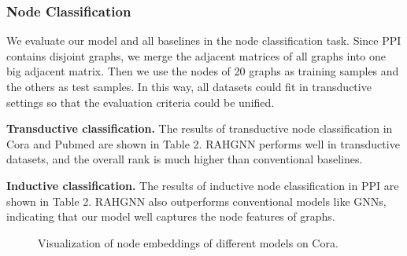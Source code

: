 \subsubsection{Node Classification}
We evaluate our model and all baselines in the node classification task. 
Since PPI contains disjoint graphs, we merge the adjacent matrices of all graphs into one big adjacent matrix. 
Then we use the nodes of 20 graphs as training samples and the others as test samples. 
In this way, all datasets could fit in transductive settings so that the evaluation criteria could be unified. 

\noindent \textbf{Transductive classification.} 
The results of transductive node classification in Cora and Pubmed are shown in Table 2. RAHGNN performs well in transductive datasets, and the overall rank is much higher than conventional baselines.    

\noindent \textbf{Inductive classification.} 
The results of inductive node classification in PPI are shown in Table 2.
RAHGNN also outperforms conventional models like GNNs, indicating that our model well captures the node features of graphs. 

\begin{figure}[ht]
\centering
{}%
\hspace{15pt}
%
\hspace{15pt}
\hspace{15pt}
\centering
\caption{Visualization of node embeddings of different models on Cora.}
\label{visualization1}
\end{figure}

